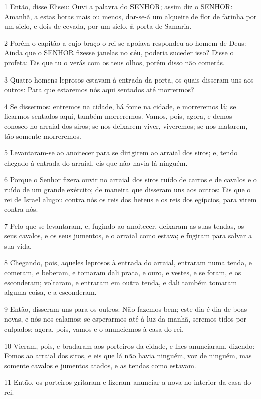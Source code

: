 \par 1 Então, disse Eliseu: Ouvi a palavra do SENHOR; assim diz o SENHOR: Amanhã, a estas horas mais ou menos, dar-se-á um alqueire de flor de farinha por um siclo, e dois de cevada, por um siclo, à porta de Samaria.
\par 2 Porém o capitão a cujo braço o rei se apoiava respondeu ao homem de Deus: Ainda que o SENHOR fizesse janelas no céu, poderia suceder isso? Disse o profeta: Eis que tu o verás com os teus olhos, porém disso não comerás.
\par 3 Quatro homens leprosos estavam à entrada da porta, os quais disseram uns aos outros: Para que estaremos nós aqui sentados até morrermos?
\par 4 Se dissermos: entremos na cidade, há fome na cidade, e morreremos lá; se ficarmos sentados aqui, também morreremos. Vamos, pois, agora, e demos conosco no arraial dos siros; se nos deixarem viver, viveremos; se nos matarem, tão-somente morreremos.
\par 5 Levantaram-se ao anoitecer para se dirigirem ao arraial dos siros; e, tendo chegado à entrada do arraial, eis que não havia lá ninguém.
\par 6 Porque o Senhor fizera ouvir no arraial dos siros ruído de carros e de cavalos e o ruído de um grande exército; de maneira que disseram uns aos outros: Eis que o rei de Israel alugou contra nós os reis dos heteus e os reis dos egípcios, para virem contra nós.
\par 7 Pelo que se levantaram, e, fugindo ao anoitecer, deixaram as suas tendas, os seus cavalos, e os seus jumentos, e o arraial como estava; e fugiram para salvar a sua vida.
\par 8 Chegando, pois, aqueles leprosos à entrada do arraial, entraram numa tenda, e comeram, e beberam, e tomaram dali prata, e ouro, e vestes, e se foram, e os esconderam; voltaram, e entraram em outra tenda, e dali também tomaram alguma coisa, e a esconderam.
\par 9 Então, disseram uns para os outros: Não fazemos bem; este dia é dia de boas-novas, e nós nos calamos; se esperarmos até à luz da manhã, seremos tidos por culpados; agora, pois, vamos e o anunciemos à casa do rei.
\par 10 Vieram, pois, e bradaram aos porteiros da cidade, e lhes anunciaram, dizendo: Fomos ao arraial dos siros, e eis que lá não havia ninguém, voz de ninguém, mas somente cavalos e jumentos atados, e as tendas como estavam.
\par 11 Então, os porteiros gritaram e fizeram anunciar a nova no interior da casa do rei.
